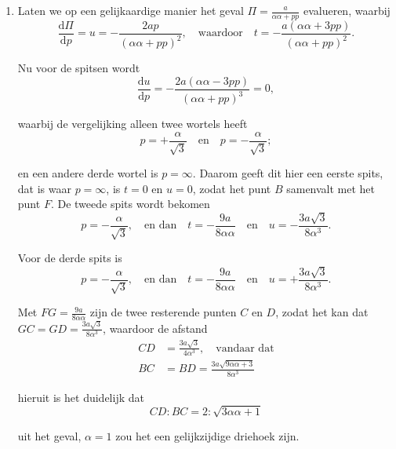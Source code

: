 \documentclass[10pt,a4paper]{article}
\newcommand{\switchenum}{\setcounter{enumi}{\arabic{enumi}-1}\switchcolumn}
\def\D{\mathrm{d}}
\begin{document}
\begin{paracol}{2}
\begin{enumerate}[topsep=1px]
		\switchenum
		\item Laten we op een gelijkaardige manier het geval $\Pi = \frac{a}{\alpha\alpha + pp}$ evalueren, waarbij
		\[
			\frac{\D \Pi}{\D p} = u = -\frac{2a p}{(\alpha \alpha + pp)^2}, \quad \text{waardoor}\quad t = -\frac{a(\alpha \alpha+ 3pp)}{(\alpha \alpha +pp)^2}.
		\]
		\par Nu voor de spitsen wordt
		\[
			\frac{\D u}{ \D p} = -\frac{2a(\alpha\alpha- 3pp)}{(\alpha\alpha+ pp)^3} = 0,
		\]
		\par waarbij de vergelijking alleen twee wortels heeft
		\[
			p = +\frac{\alpha}{\sqrt{3}} \quad \text{en} \quad p = -\frac{\alpha}{\sqrt{3}};
		\]
		\par en een andere derde wortel is $p=\infty$. Daarom geeft dit hier een eerste spits, dat is waar $p=\infty$, is $t=0$ en $u=0$, zodat het punt $B$ samenvalt met het punt $F$. De tweede spits wordt bekomen
		\[
			p = -\frac{\alpha}{\sqrt{3}}, \quad \text{en dan} \quad t = -\frac{9a}{8\alpha \alpha} \quad \text{en} \quad u=-\frac{3a \sqrt{3}}{8\alpha^3}.
		\]
		\par Voor de derde spits is
		\[
			p = -\frac{\alpha}{\sqrt{3}}, \quad \text{en dan} \quad t = -\frac{9a}{8\alpha \alpha} \quad \text{en} \quad u=+\frac{3a \sqrt{3}}{8\alpha^3}.
		\]
		\par Met $FG = \frac{9a}{8\alpha \alpha}$ zijn de twee resterende punten $C$ en $D$, zodat het kan dat $GC=GD=\frac{3a\sqrt{3}}{8\alpha^3}$, waardoor de afstand
		\begin{align*}
			CD& = \frac{3a \sqrt{3}}{4\alpha^3}, \quad \text{vandaar dat}\\
			BC &= BD = \frac{3a \sqrt{9\alpha \alpha+3}}{8\alpha^3}
		\end{align*}
		\par hieruit is het duidelijk dat
		\[
			CD : BC = 2:\sqrt{3\alpha\alpha + 1}
		\]
		\par uit het geval, $\alpha =1$ zou het een gelijkzijdige driehoek zijn.
		\switchcolumn*	
		

\end{enumerate}
\end{paracol}
\end{document}
